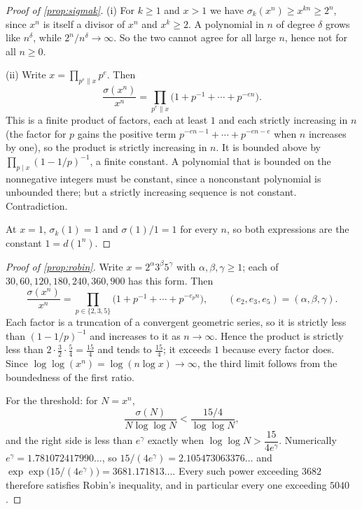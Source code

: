 \documentclass[11pt]{amsart}
\theoremstyle{definition}
\theoremstyle{remark}
\begin{document}
\begin{proof}[Proof of \cref{prop:sigmak}]
(i) For $k \ge 1$ and $x > 1$ we have $\sigma_{k}(x^{n}) \ge x^{kn} \ge 2^{n}$, since $x^{n}$ is itself a divisor of $x^{n}$ and $x^{k} \ge 2$. A polynomial in $n$ of degree $\delta$ grows like $n^{\delta}$, while $2^{n}/n^{\delta} \to \infty$. So the two cannot agree for all large $n$, hence not for all $n \ge 0$.

(ii) Write $x = \prod_{p^{e}\|x}p^{e}$. Then
\[
  \frac{\sigma(x^{n})}{x^{n}} = \prod_{p^{e}\|x}\bigl(1+p^{-1}+\cdots+p^{-en}\bigr).
\]
This is a finite product of factors, each at least $1$ and each strictly increasing in $n$ (the factor for $p$ gains the positive term $p^{-en-1}+\cdots+p^{-en-e}$ when $n$ increases by one), so the product is strictly increasing in $n$. It is bounded above by $\prod_{p \mid x}(1-1/p)^{-1}$, a finite constant. A polynomial that is bounded on the nonnegative integers must be constant, since a nonconstant polynomial is unbounded there; but a strictly increasing sequence is not constant. Contradiction.

At $x=1$, $\sigma_{k}(1)=1$ and $\sigma(1)/1=1$ for every $n$, so both expressions are the constant $1=d(1^{n})$.
\end{proof}

\begin{proof}[Proof of \cref{prop:robin}]
Write $x = 2^{\alpha}3^{\beta}5^{\gamma}$ with $\alpha,\beta,\gamma \ge 1$; each of $30,\allowbreak 60,\allowbreak 120,\allowbreak 180,\allowbreak 240,\allowbreak 360,\allowbreak 900$ has this form. Then
\[
  \frac{\sigma(x^{n})}{x^{n}} = \prod_{p \in \{2,3,5\}}\bigl(1+p^{-1}+\cdots+p^{-e_{p}n}\bigr),
  \qquad (e_{2},e_{3},e_{5}) = (\alpha,\beta,\gamma).
\]
Each factor is a truncation of a convergent geometric series, so it is strictly less than $(1-1/p)^{-1}$ and increases to it as $n \to \infty$. Hence the product is strictly less than $2 \cdot \tfrac{3}{2}\cdot\tfrac{5}{4} = \tfrac{15}{4}$ and tends to $\tfrac{15}{4}$; it exceeds $1$ because every factor does. Since $\log\log(x^{n}) = \log(n\log x) \to \infty$, the third limit follows from the boundedness of the first ratio.

For the threshold: for $N = x^{n}$,
\[
  \frac{\sigma(N)}{N\log\log N} < \frac{15/4}{\log\log N},
\]
and the right side is less than $e^{\gamma}$ exactly when $\log\log N > \dfrac{15}{4e^{\gamma}}$. Numerically $e^{\gamma}=1.781072417990\ldots$, so $15/(4e^{\gamma}) = 2.105473063376\ldots$ and $\exp\exp\bigl(15/(4e^{\gamma})\bigr) = 3681.171813\ldots$. Every such power exceeding $3682$ therefore satisfies Robin's inequality, and in particular every one exceeding $5040$.
\end{proof}
\end{document}
